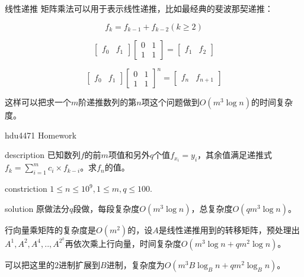 \documentclass{beamer}
\begin{document}
	\begin{frame}{线性递推}
		矩阵乘法可以用于表示线性递推，比如最经典的斐波那契递推：
		
		$$f_k=f_{k-1}+f_{k-2}(k \ge 2)$$
		
		$$\begin{bmatrix}f_0 & f_1\end{bmatrix}\begin{bmatrix}0 & 1\\1 & 1\end{bmatrix}=\begin{bmatrix}f_1 & f_2\end{bmatrix}$$
		
		$$\begin{bmatrix}f_0 & f_1\end{bmatrix}\begin{bmatrix}0 & 1\\1 & 1\end{bmatrix}^n=\begin{bmatrix}f_n & f_{n+1}\end{bmatrix}$$
		
		这样可以把求一个$m$阶递推数列的第$n$项这个问题做到$O(m^3\log n)$的时间复杂度。
	\end{frame}
	\begin{frame}{hdu4471 Homework}
		\begin{block}{description}
			已知数列$f$的前$m$项值和另外$q$个值$f_{x_i}=y_i$，其余值满足递推式$f_k=\sum_{i=1}^mc_i\times f_{k-i}$。求$f_n$的值。
		\end{block}
		\begin{block}{constriction}
			$1 \le n \le 10^9, 1 \le m, q \le 100.$
		\end{block}
		\pause
		\begin{block}{solution}
			原做法分$q$段做，每段复杂度$O(m^3\log n)$，总复杂度$O(qm^3\log n)$。
			
			行向量乘矩阵的复杂度是$O(m^2)$的，设$A$是线性递推用到的转移矩阵，预处理出$A^1,A^2,A^4,..,A^{2^k}$再依次乘上行向量，时间复杂度$O(m^3\log n+qm^2\log n)$。
			
			可以把这里的$2$进制扩展到$B$进制，复杂度为$O(m^3B\log_Bn+qm^2\log_Bn)$。
		\end{block}
	\end{frame}
\end{document}
